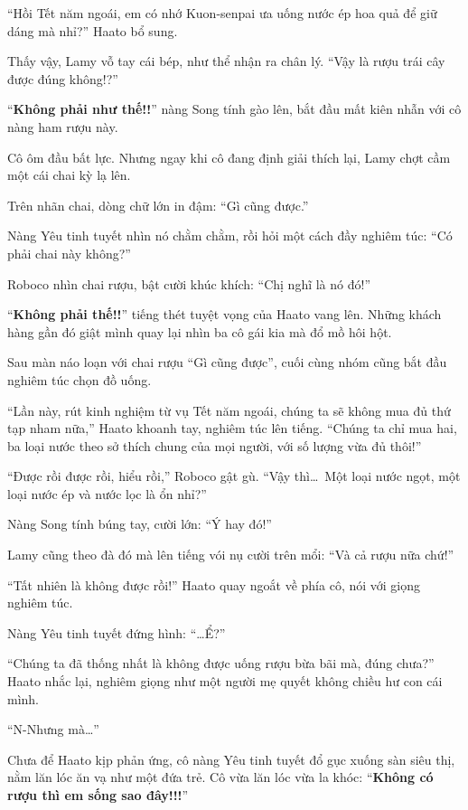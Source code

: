 \documentclass[../main.tex]{subfiles}
\begin{document}
``Hồi Tết năm ngoái, em có nhớ Kuon-senpai ưa uống nước ép hoa quả để giữ dáng mà nhỉ?'' Haato bổ sung.

Thấy vậy, Lamy vỗ tay cái bép, như thể nhận ra chân lý. ``Vậy là rượu trái cây được đúng không!?''

``\textbf{Không phải như thế!!}'' nàng Song tính gào lên, bắt đầu mất kiên nhẫn với cô nàng ham rượu này.

Cô ôm đầu bất lực. Nhưng ngay khi cô đang định giải thích lại, Lamy chợt cầm một cái chai kỳ lạ lên.

Trên nhãn chai, dòng chữ lớn in đậm: ``Gì cũng được.''

Nàng Yêu tinh tuyết nhìn nó chằm chằm, rồi hỏi một cách đầy nghiêm túc: ``Có phải chai này không?''

Roboco nhìn chai rượu, bật cười khúc khích: ``Chị nghĩ là nó đó!''

``\textbf{Không phải thế!!}'' tiếng thét tuyệt vọng của Haato vang lên. Những khách hàng gần đó giật mình quay lại nhìn ba cô gái kia mà đổ mồ hôi hột.

\ct

Sau màn náo loạn với chai rượu ``Gì cũng được'', cuối cùng nhóm cũng bắt đầu nghiêm túc chọn đồ uống.

``Lần này, rút kinh nghiệm từ vụ Tết năm ngoái, chúng ta sẽ không mua đủ thứ tạp nham nữa,'' Haato khoanh tay, nghiêm túc lên tiếng. ``Chúng ta chỉ mua hai, ba loại nước theo sở thích chung của mọi người, với số lượng vừa đủ thôi!''

``Được rồi được rồi, hiểu rồi,'' Roboco gật gù. ``Vậy thì\dots\ Một loại nước ngọt, một loại nước ép và nước lọc là ổn nhỉ?''

Nàng Song tính búng tay, cười lớn: ``Ý hay đó!''

Lamy cũng theo đà đó mà lên tiếng vói nụ cười trên mổi: ``Và cả rượu nữa chứ!''

``Tất nhiên là không được rồi!'' Haato quay ngoắt về phía cô, nói với giọng nghiêm túc.

Nàng Yêu tinh tuyết đứng hình: ``\dots Ể?''

``Chúng ta đã thống nhất là không được uống rượu bừa bãi mà, đúng chưa?'' Haato nhắc lại, nghiêm giọng như một người mẹ quyết không chiều hư con cái mình.

``N-Nhưng mà\dots''

Chưa để Haato kịp phản ứng, cô nàng Yêu tinh tuyết đổ gục xuống sàn siêu thị, nằm lăn lóc ăn vạ như một đứa trẻ. Cô vừa lăn lóc vừa la khóc: ``\textbf{Không có rượu thì em sống sao đây!!!}''
\end{document}
